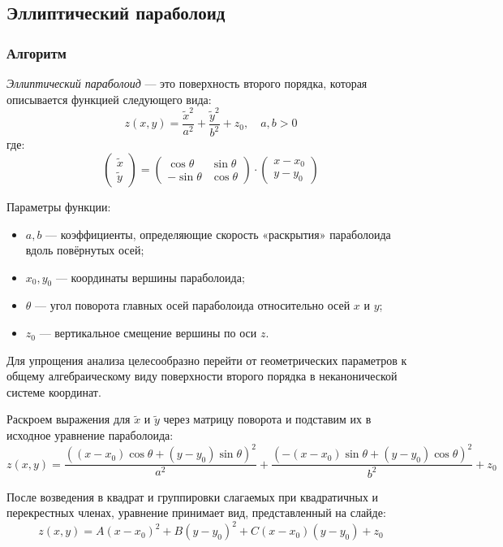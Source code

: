 \subsection{Эллиптический параболоид}

\subsubsection{Алгоритм}

\textit{Эллиптический параболоид} --- это поверхность второго порядка, которая описывается функцией следующего вида:
\[
z(x, y) = \frac{\tilde{x}^2}{a^2} + \frac{\tilde{y}^2}{b^2} + z_0,\quad a,b>0
\]
где:
\[
\begin{pmatrix}
\tilde{x} \\
\tilde{y}
\end{pmatrix}
=
\begin{pmatrix}
\cos\theta & \sin\theta \\
-\sin\theta & \cos\theta
\end{pmatrix}
\cdot
\begin{pmatrix}
x - x_0 \\
y - y_0
\end{pmatrix}
\]

Параметры функции:
\begin{itemize}
  \item $a, b$ --- коэффициенты, определяющие скорость «раскрытия» параболоида вдоль повёрнутых осей;
  \item $x_0, y_0$ --- координаты вершины параболоида;
  \item $\theta$ --- угол поворота главных осей параболоида относительно осей $x$ и $y$;
  \item $z_0$ --- вертикальное смещение вершины по оси $z$.
\end{itemize}

Для упрощения анализа целесообразно перейти от геометрических параметров к общему алгебраическому виду поверхности второго порядка в неканонической системе координат. 

Раскроем выражения для $\tilde{x}$ и $\tilde{y}$ через матрицу поворота и подставим их в исходное уравнение параболоида:
\[
z(x, y) = \frac{( (x - x_0) \cos\theta + (y - y_0) \sin\theta )^2}{a^2} + \frac{( -(x - x_0) \sin\theta + (y - y_0) \cos\theta )^2}{b^2} + z_0
\]

После возведения в квадрат и группировки слагаемых при квадратичных и перекрестных членах, уравнение принимает вид, представленный на слайде:
\[
z(x,y) = A(x - x_0)^2 + B(y - y_0)^2 + C(x - x_0)(y - y_0) + z_0
\]

